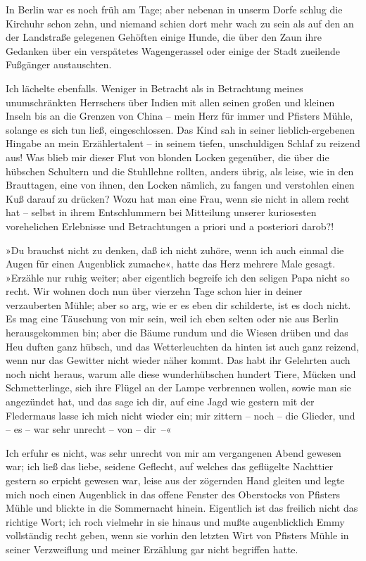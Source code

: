 In Berlin war es noch früh am Tage; aber nebenan in unserm Dorfe
schlug die Kirchuhr schon zehn, und niemand schien dort mehr wach
zu sein als auf den an der Landstraße gelegenen Gehöften einige
Hunde, die über den Zaun ihre Gedanken über ein verspätetes
Wagengerassel oder einige der Stadt zueilende Fußgänger
austauschten.

Ich lächelte ebenfalls. Weniger in Betracht als in Betrachtung
meines unumschränkten Herrschers über Indien mit allen seinen
großen und kleinen Inseln bis an die Grenzen von China – mein Herz
für immer und Pfisters Mühle, solange es sich tun ließ,
eingeschlossen. Das Kind sah in seiner lieblich-ergebenen Hingabe
an mein Erzählertalent – in seinem tiefen, unschuldigen Schlaf zu
reizend aus! Was blieb mir dieser Flut von blonden Locken
gegenüber, die über die hübschen Schultern und die Stuhllehne
rollten, anders übrig, als leise, wie in den Brauttagen, eine von
ihnen, den Locken nämlich, zu fangen und verstohlen einen Kuß
darauf zu drücken? Wozu hat man eine Frau, wenn sie nicht in allem
recht hat – selbst in ihrem Entschlummern bei Mitteilung unserer
kuriosesten vorehelichen Erlebnisse und Betrachtungen a priori und
a posteriori darob?!

»Du brauchst nicht zu denken, daß ich nicht zuhöre, wenn ich auch
einmal die Augen für einen Augenblick zumache«, hatte das Herz
mehrere Male gesagt. »Erzähle nur ruhig weiter; aber eigentlich
begreife ich den seligen Papa nicht so recht. Wir wohnen doch nun
über vierzehn Tage schon hier in deiner verzauberten Mühle; aber so
arg, wie er es eben dir schilderte, ist es doch nicht. Es mag eine
Täuschung von mir sein, weil ich eben selten oder nie aus Berlin
herausgekommen bin; aber die Bäume rundum und die Wiesen drüben und
das Heu duften ganz hübsch, und das Wetterleuchten da hinten ist
auch ganz reizend, wenn nur das Gewitter nicht wieder näher kommt.
Das habt ihr Gelehrten auch noch nicht heraus, warum alle diese
wunderhübschen hundert Tiere, Mücken und Schmetterlinge, sich ihre
Flügel an der Lampe verbrennen wollen, sowie man sie angezündet
hat, und das sage ich dir, auf eine Jagd wie gestern mit der
Fledermaus lasse ich mich nicht wieder ein; mir zittern – noch –
die Glieder, und – es – war sehr unrecht – von – dir~–«

Ich erfuhr es nicht, was sehr unrecht von mir am vergangenen Abend
gewesen war; ich ließ das liebe, seidene Geflecht, auf welches das
geflügelte Nachttier gestern so erpicht gewesen war, leise aus der
zögernden Hand gleiten und legte mich noch einen Augenblick in das
offene Fenster des Oberstocks von Pfisters Mühle und blickte in die
Sommernacht hinein. Eigentlich ist das freilich nicht das richtige
Wort; ich roch vielmehr in sie hinaus und mußte augenblicklich Emmy
vollständig recht geben, wenn sie vorhin den letzten Wirt von
Pfisters Mühle in seiner Verzweiflung und meiner Erzählung gar
nicht begriffen hatte.

